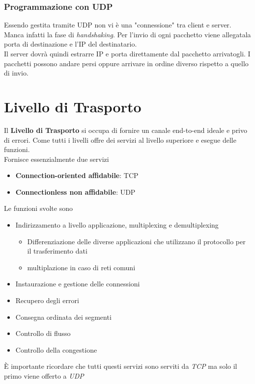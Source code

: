 \documentclass{article}
\begin{document}
            \subsubsection{Programmazione con UDP}
                Essendo gestita tramite UDP non vi è una "connessione" tra client e server. Manca infatti la fase di \textit{handshaking}. Per l'invio di ogni pacchetto viene allegatala porta di destinazione e l'IP del destinatario.\\
                Il server dovrà quindi estrarre IP e porta direttamente dal pacchetto arrivatogli. I pacchetti possono andare persi oppure arrivare in ordine diverso rispetto a quello di invio. 

\newpage                
    \section{Livello di Trasporto}
        Il \textbf{Livello di Trasporto} si occupa di fornire un canale end-to-end ideale e privo di errori. Come tutti i livelli offre dei servizi al livello superiore e esegue delle funzioni.\\
        Fornisce essenzialmente due servizi
        \begin{itemize}
            \item \textbf{Connection-oriented affidabile}: TCP
            \item \textbf{Connectionless non affidabile}: UDP
        \end{itemize}
        Le funzioni svolte sono
        \begin{itemize}
            \item Indirizzamento a livello applicazione, multiplexing e demultiplexing
                  \begin{itemize}
                      \item Differenziazione delle diverse applicazioni che utilizzano il protocollo per il trasferimento dati
                      \item multiplazione in caso di reti comuni
                  \end{itemize}
            \item Instaurazione e gestione delle connessioni
            \item Recupero degli errori
            \item Consegna ordinata dei segmenti
            \item Controllo di flusso
            \item Controllo della congestione
        \end{itemize}
        È importante ricordare che tutti questi servizi sono serviti da \textit{TCP} ma solo il primo viene offerto a \textit{UDP}
\end{document}
